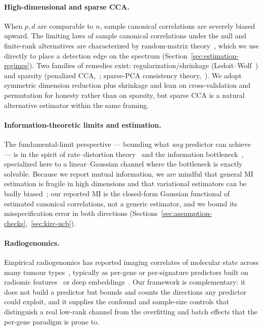 \documentclass{article}
\begin{document}
\paragraph{High-dimensional and sparse CCA.}
When $p,d$ are comparable to $n$, sample canonical correlations are severely
biased upward. The limiting laws of sample canonical correlations under the null
and finite-rank alternatives are characterized by random-matrix
theory~\citep{wachter1980limiting,yang2015independence,bao2019cca}, which we use
directly to place a detection edge on the spectrum
(Section~\ref{sec:estimation-regimes}). Two families of remedies exist:
regularization/shrinkage (Ledoit--Wolf~\citep{ledoit2004shrinkage}) and sparsity
(penalized CCA,~\citealp{witten2009sparsecca}; sparse-PCA consistency
theory,~\citealp{johnstone2009pca}). We adopt symmetric dimension reduction plus
shrinkage and lean on cross-validation and permutation for honesty rather than on
sparsity, but sparse CCA is a natural alternative estimator within the same
framing.

\paragraph{Information-theoretic limits and estimation.}
The fundamental-limit perspective --- bounding what \emph{any} predictor can
achieve --- is in the spirit of rate--distortion theory~\citep{berger1971rate}
and the information bottleneck~\citep{tishby1999ib,chechik2005gaussianib,tishby2015deep},
specialized here to a linear--Gaussian channel where the bottleneck is exactly
solvable. Because we report mutual information, we are mindful that general MI
estimation is fragile in high dimensions and that variational estimators can be
badly biased~\citep{mcallester2020stratos,kraskov2004mi,belghazi2018mine}; our
reported MI is the closed-form Gaussian functional of estimated canonical
correlations, not a generic estimator, and we bound its misspecification error in
both directions (Sections~\ref{sec:assumption-checks},~\ref{sec:kirc-ucb}).

\paragraph{Radiogenomics.}
Empirical radiogenomics has reported imaging correlates of molecular state across
many tumour types~\citep{gevaert2012nsclc,jamshidi2015ccrcc,karlo2014ccrcc,shinagare2015ccrcc,udayakumar2024radiogenomic,bi2019ai,hosny2018ai},
typically as per-gene or per-signature predictors built on radiomic
features~\citep{lambin2012radiomics,aerts2014radiomics,vangriethuysen2017pyradiomics}
or deep embeddings~\citep{mei2022radimagenet}. Our framework is complementary: it
does not build a predictor but bounds and counts the directions any predictor
could exploit, and it supplies the confound and sample-size controls that
distinguish a real low-rank channel from the overfitting and batch effects that
the per-gene paradigm is prone to.
\end{document}
